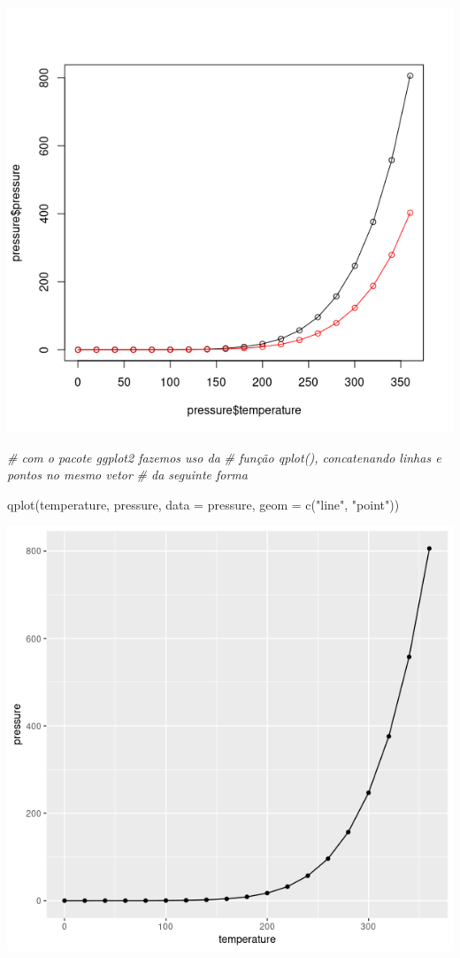 \documentclass[
]{book}
\newenvironment{Shaded}{\begin{snugshade}}{\end{snugshade}}
\newcommand{\AttributeTok}[1]{\textcolor[rgb]{0.77,0.63,0.00}{#1}}
\newcommand{\CommentTok}[1]{\textcolor[rgb]{0.56,0.35,0.01}{\textit{#1}}}
\newcommand{\FunctionTok}[1]{\textcolor[rgb]{0.00,0.00,0.00}{#1}}
\newcommand{\NormalTok}[1]{#1}
\newcommand{\StringTok}[1]{\textcolor[rgb]{0.31,0.60,0.02}{#1}}
\begin{document}
\includegraphics{figure/g4.png}

\begin{Shaded}
\begin{Highlighting}[]
\CommentTok{\# com o pacote ggplot2 fazemos uso da}
\CommentTok{\# função qplot(), concatenando linhas e pontos no mesmo vetor}
\CommentTok{\# da seguinte forma}

\FunctionTok{qplot}\NormalTok{(temperature, pressure, }\AttributeTok{data =}\NormalTok{ pressure, }\AttributeTok{geom =} \FunctionTok{c}\NormalTok{(}\StringTok{"line"}\NormalTok{,}
\StringTok{"point"}\NormalTok{))}
\end{Highlighting}
\end{Shaded}

\includegraphics{figure/g5.png}
\end{document}
